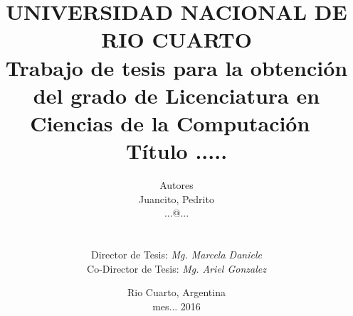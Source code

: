 \documentclass[oneside,letterpaper,10pt,spanish]{report}
\begin{document}
\title{
UNIVERSIDAD NACIONAL DE RIO CUARTO\\
$\;$\\
$\;$\\
\small{Trabajo de tesis para la obtenci\'on del grado de Licenciatura en Ciencias de la Computaci\'on}
$\;$\\$\;$\\
\Large{\textbf{ T\'itulo .....}}
} 

\author{
                        Autores\\
                        Juancito, Pedrito\\
                   ...@...\\ \\ \\
                 Director de Tesis: \emph{Mg. Marcela Daniele}\\ 
                 Co-Director de Tesis: \emph{Mg. Ariel Gonzalez}\\ 
}

\date{Rio Cuarto, Argentina\\ mes... 2016}

 
\maketitle
 

\newpage
\mbox{}
\thispagestyle{empty} %




\listoffigures
{} %

\tableofcontents %


\pagestyle{fancy}
\renewcommand{\sectionmark}[1]{}
\renewcommand{\chaptermark}[1]{\markboth{#1}{}} %


















%

  






\printindex
\end{document}
